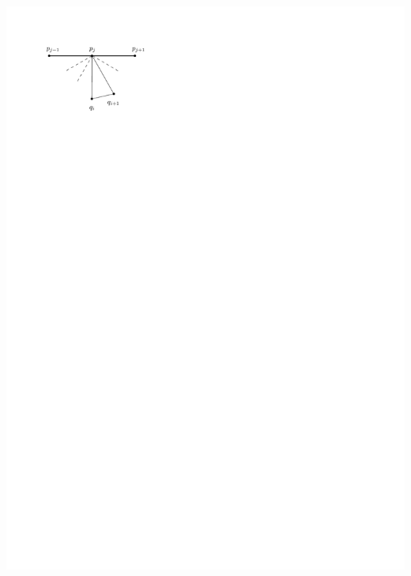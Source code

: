 \documentclass[a4paper]{article}
\begin{document}
\includegraphics[width=\linewidth]{unifiedAlgo/img/walkProofA}
\clearpage%
\end{document}
